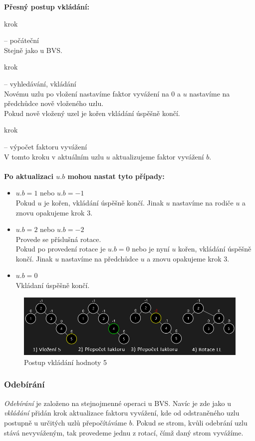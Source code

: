 \documentclass[
  biblatex=false,
  font=serif,
  glossaries=false,
  tables=false,
  theorems=false,
  index
]{kidiplom}
\begin{document}
\newpage
\noindent \textbf{Přesný postup vkládání:}
\begin{enumerate} {\bfseries
\item  krok} -- počáteční \\
Stejně jako u BVS.
{\bfseries\item  krok} -- vyhledávání, vkládání \\
Novému uzlu po vložení nastavíme faktor vyvážení na 0 a $u$ nastavíme na předchůdce nově vloženého uzlu.\\
Pokud nově vložený uzel je kořen vkládání úspěšně končí.
{\bfseries\item  krok} -- výpočet faktoru vyvážení \\
V tomto kroku v aktuálním uzlu $u$ aktualizujeme faktor vyvážení $b$.\\\\
\textbf{Po aktualizaci $u.b$ mohou nastat tyto případy:}
\begin{itemize}
\item $u.b = 1$ nebo $u.b = -1$\\
Pokud $u$ je kořen, vkládání úspěšně končí. Jinak $u$ nastavíme na rodiče $u$ a znovu opakujeme krok 3.
\item $u.b = 2$ nebo $u.b = -2$\\
Provede se příslušná rotace.\\
Pokud po provedení rotace je $u.b = 0$ nebo je nyní $u$ kořen, vkládání úspěšně končí. Jinak $u$ nastavíme na předchůdce $u$ a znovu opakujeme krok 3.
\item $u.b = 0$\\
Vkládaní úspěšně končí.
\end{itemize}
\end{enumerate}

\begin{figure}[h!]
\centering
	\includegraphics[scale=0.55]{obrazky/15AVLVlozeni.png}
	\caption{Postup vkládání hodnoty 5}
\end{figure}

\subsubsection{Odebírání}
\indent\indent \textit{Odebírání} je založeno na stejnojmenné operaci u BVS. Navíc je zde jako u \textit{vkládání} přidán krok aktualizace faktoru vyvážení, kde od odstraněného uzlu postupně u určitých uzlů přepočítáváme $b$. Pokud se strom, kvůli odebrání uzlu stává nevyváženým, tak provedeme jednu z rotací, čímž daný strom vyvážíme. 
\end{document}
